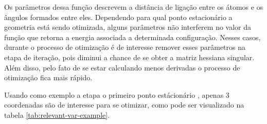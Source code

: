 Os parâmetros dessa função descrevem a distância de ligação entre os átomos e os ângulos formados entre eles. Dependendo para qual ponto estacionário a geometria está sendo otimizada, alguns parâmetros não interferem no valor da função que retorna a energia associada a determinada configuração. Nesses casos, durante o processo de otimização é de interesse remover esses parâmetros na etapa de iteração, pois diminui a chance de se obter a matriz hessiana singular. Além disso, pelo fato de se estar calculando menos derivadas o processo de otimização fica mais rápido. 

Usando como exemplo a etapa o primeiro ponto estácionário , apenas 3 coordenadas são de interesse para se otimizar, como pode ser visualizado na tabela \ref{tab:relevant-var-example}.

\begin{table}[h]
\centering
  \caption{Coordenadas de interesse para otimização do ponto estacionário .}
\label{tab:relevant-var-example}
\end{table}

